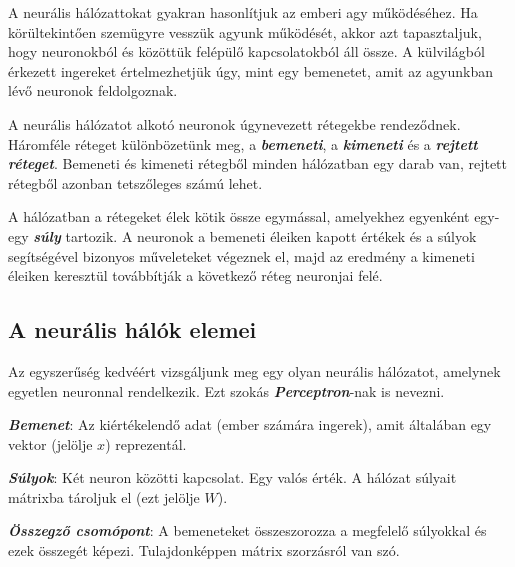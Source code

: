 





A neurális hálózattokat \cite{neuralis77} gyakran hasonlítjuk az emberi agy működéséhez. Ha körültekintően szemügyre vesszük agyunk működését, akkor azt tapasztaljuk, hogy neuronokból és közöttük felépülő kapcsolatokból áll össze. A külvilágból érkezett ingereket értelmezhetjük úgy, mint egy bemenetet, amit az agyunkban lévő neuronok feldolgoznak.

A neurális hálózatot alkotó neuronok úgynevezett rétegekbe rendeződnek. Háromféle réteget különbözetünk meg, a \textbf{\textit{bemeneti}}, a \textbf{\textit{kimeneti}} és a \textbf{\textit{rejtett réteget}}. Bemeneti és kimeneti rétegből minden hálózatban egy darab van, rejtett rétegből azonban tetszőleges számú lehet.

A hálózatban a rétegeket élek kötik össze egymással, amelyekhez egyenként egy-egy \textbf{\textit{súly}} tartozik. A neuronok a bemeneti éleiken kapott értékek és a súlyok segítségével bizonyos műveleteket végeznek el, majd az eredmény a kimeneti éleiken keresztül továbbítják a következő réteg neuronjai felé.

\subsection{A neurális hálók elemei}

Az egyszerűség kedvéért vizsgáljunk meg egy olyan neurális hálózatot, amelynek egyetlen neuronnal rendelkezik. Ezt szokás \textbf{\textit{Perceptron}}-nak is nevezni.

\textbf{\textit{Bemenet}}: Az kiértékelendő adat (ember számára ingerek), amit általában egy vektor (jelölje $x$) reprezentál.

\textit{\textbf{Súlyok}}: Két neuron közötti kapcsolat. Egy valós érték. A hálózat súlyait mátrixba tároljuk el (ezt jelölje $W$).

\textbf{\textit{Összegző csomópont}}: A bemeneteket összeszorozza a megfelelő súlyokkal és ezek összegét képezi. Tulajdonképpen mátrix szorzásról van szó.


